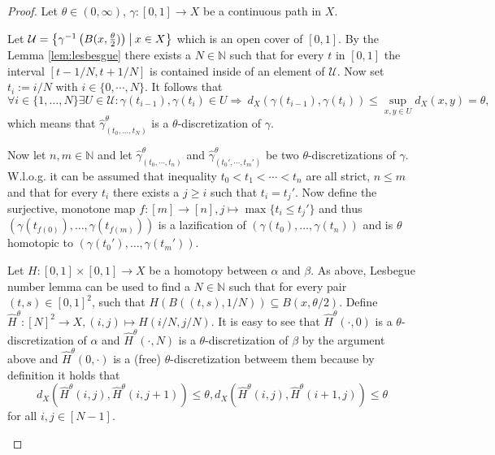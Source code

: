 \documentclass[a4paper, 11pt, twoside]{article}
\newcommand{\N}[0]{\mathbb{N}}
\theoremstyle{break}
\theoremstyle{break}
\begin{document}
\begin{proof}
  Let $\theta \in (0, \infty)$, $\gamma\colon [0,1] \to X$ be a continuous path in $X$. 
  
  Let $\mathcal{U} = \left\{\gamma^{-1}\left(B(x,{\theta \over 2})\right) \: \middle| \: x \in X \right\}$ which is an open cover of $[0,1]$.
  By the Lemma \ref{lem:lesbesgue} there exists a $N \in \N$ such that for every $t$ in $[0,1]$ the interval $[t-1/N, t+1/N]$ is contained inside of an element of $\mathcal{U}$.
  Now set $t_i := i/N$ with $i \in \{0, \cdots, N\}$. It follows that
  \begin{equation*}
    \forall i \in \{1, \ldots, N\}\exists U \in \mathcal{U}: \gamma(t_{i-1}), \gamma(t_i) \in U \Rightarrow \: d_X(\gamma(t_{i-1}), \gamma(t_i)) \leq \sup\limits_{x,y \in U} d_X(x,y) = \theta,
  \end{equation*}
  which means that $\widehat{\gamma}^{\theta}_{(t_0, \ldots, t_N)}$ is a $\theta$-discretization of $\gamma$.

  Now let $n,m \in \N$ and let $\widehat{\gamma}_{(t_0, \cdots, t_n)}^{\theta}$ and $\widehat{\gamma}_{(t_0', \cdots, t_m')}^{\theta}$ be two $\theta$-discretizations of $\gamma$.
  W.l.o.g. it can be assumed that inequality $t_0 < t_1 < \cdots < t_n$ are all strict, $n \leq m$ and that for every $t_i$ there exists a $j \geq i$ such that $t_i = t_j'$.
  Now define the surjective, monotone map $f\colon [m] \to [n], j \mapsto \max \{t_i \leq t_j'\}$ 
  and thus $(\gamma(t_{f(0)}), \ldots, \gamma(t_{f(m)}))$ is a lazification of $(\gamma(t_0), \ldots, \gamma(t_n))$ and is $\theta$ homotopic to $(\gamma(t_0'), \ldots, \gamma(t_m'))$.
  
  Let $H\colon [0,1] \times [0,1] \to X$ be a homotopy between $\alpha$ and $\beta$. As above, Lesbegue number lemma can be used to find a $N \in \N$ 
  such that for every pair $(t,s) \in [0,1]^2$, such that $H(B((t,s),1/N)) \subseteq B(x, \theta/2)$.
  Define $\widehat{H}^{\theta}\colon [N]^2 \to X, (i,j) \mapsto H(i/N, j/N)$. It is easy to see that $\widehat{H}^{\theta}(\cdot, 0)$ is a $\theta$-discretization of $\alpha$ and
  $\widehat{H}^{\theta}(\cdot, N)$ is a $\theta$-discretization of $\beta$ by the argument above and $\widehat{H}^{\theta}(0, \cdot)$ is a (free) $\theta$-discretization betweem them because by definition it holds that
  \begin{equation*}
    d_X(\widehat{H}^{\theta}(i,j), \widehat{H}^{\theta}(i,j+1)) \leq \theta, d_X(\widehat{H}^{\theta}(i,j), \widehat{H}^{\theta}(i+1,j)) \leq \theta
  \end{equation*}
  for all $i, j \in [N-1]$.

  \cite[p. 4]{vigolo2018fundamental}
\end{proof}
\end{document}
